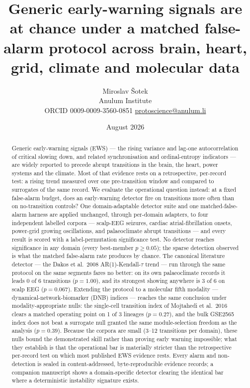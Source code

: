 \documentclass[11pt]{article}
\title{Generic early-warning signals are at chance under a matched
false-alarm protocol across brain, heart, grid, climate and molecular
data}
\author{Miroslav \v{S}otek\\
  Anulum Institute\\
  ORCID 0009-0009-3560-0851 \quad \href{mailto:protoscience@anulum.li}{protoscience@anulum.li}}
\date{August 2026}
\begin{document}
\maketitle

\begin{abstract}
Generic early-warning signals (EWS) --- the rising variance and lag-one
autocorrelation of critical slowing down, and related synchronisation
and ordinal-entropy indicators --- are widely reported to precede abrupt
transitions in the brain, the heart, power systems and the climate. Most
of that evidence rests on a retrospective, per-record test: a rising
trend measured over one pre-transition window and compared to surrogates
of the same record. We evaluate the operational question instead: at a
fixed false-alarm budget, does an early-warning detector fire on
transitions more often than on no-transition controls? One
domain-adaptable detector suite and one matched-false-alarm harness are
applied unchanged, through per-domain adapters, to four independent
labelled corpora --- scalp-EEG seizures, cardiac atrial-fibrillation
onsets, power-grid growing oscillations, and palaeoclimate abrupt
transitions --- and every result is scored with a label-permutation
significance test. No detector reaches significance in any domain (every
best-member $p \ge 0.05$); the sparse detection observed is what the
matched false-alarm rate produces by chance. The canonical literature
detector --- the Dakos et al.\ 2008 AR(1)-Kendall-$\tau$ trend --- run
through the same protocol on the same segments fares no better: on its
own palaeoclimate records it leads 0 of 6 transitions ($p = 1.00$), and
its strongest showing anywhere is 3 of 6 on scalp EEG ($p = 0.067$).
Extending the protocol to a molecular fifth modality ---
dynamical-network-biomarker (DNB) indices --- reaches the same
conclusion under modality-appropriate nulls: the single-cell transition
index of Mojtahedi et al.\ 2016 clears a matched operating point on 1
of 3 lineages ($p = 0.27$), and the bulk GSE2565 index does not beat a
surrogate null granted the same module-selection freedom as the
analysis ($p = 0.39$). Because the corpora are small (3--12 transitions
per domain), these nulls bound the demonstrated skill rather than
proving early warning impossible; what they establish is that the
operational bar is materially stricter than the retrospective
per-record test on which most published EWS evidence rests. Every alarm
and non-detection is sealed in content-addressed, byte-reproducible
evidence records; a companion manuscript shows a domain-specific
detector clearing the identical bar where a deterministic instability
signature exists.
\end{abstract}
\end{document}
